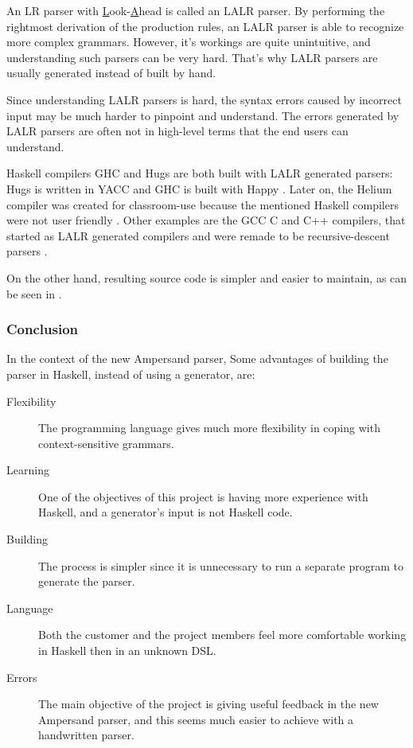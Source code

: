 %
An LR parser with \underline{L}ook-\underline{A}head is called an LALR parser.
By performing the rightmost derivation of the production rules, an LALR parser is able to recognize more complex grammars.
However, it's workings are quite unintuitive, and understanding such parsers can be very hard.
That's why LALR parsers are usually generated instead of built by hand.

Since understanding LALR parsers is hard, the syntax errors caused by incorrect input may be much harder to pinpoint and understand.
The errors generated by LALR parsers are often not in high-level terms that the end users can understand.

%
%
%
%
%
Haskell compilers GHC and Hugs are both built with LALR generated parsers: Hugs is written in YACC \cite{hugs-parser} and GHC is built with Happy \cite{ghc-parser}.
Later on, the Helium compiler was created for classroom-use because the mentioned Haskell compilers were not user friendly \cite{helium-parser}.
Other examples are the GCC C and C++ compilers, that started as LALR generated compilers and were remade to be recursive-descent parsers \cite{gcc-c-parser} \cite{gcc-cpp-parser}.

On the other hand, resulting source code is simpler and easier to maintain, as can be seen in \cite{parser-examples}.

\subsubsection{Conclusion}
In the context of the new Ampersand parser, Some advantages of building the parser in Haskell, instead of using a generator, are:
\begin{description}
	\item[Flexibility] The programming language gives much more flexibility in coping with context-sensitive grammars.
	\item[Learning] One of the objectives of this project is having more experience with Haskell, and a generator's input is not Haskell code.
	\item[Building] The process is simpler since it is unnecessary to run a separate program to generate the parser.
	\item[Language] Both the customer and the project members feel more comfortable working in Haskell then in an unknown DSL.
	\item[Errors] The main objective of the project is giving useful feedback in the new Ampersand parser, and this seems much easier to achieve with a handwritten parser.
\end{description}

